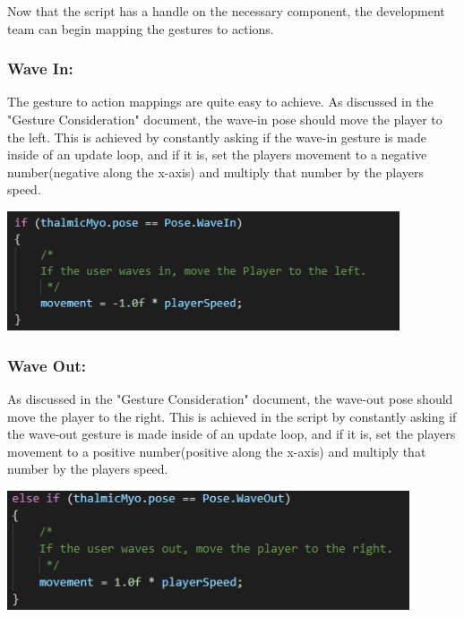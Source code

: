 \documentclass{article}
\begin{document}
\bigskip

Now that the script has a handle on the necessary component, the development team can begin mapping the gestures to actions.



\subsubsection{Wave In:}

The gesture to action mappings are quite easy to achieve. As discussed in the "Gesture Consideration" document, the wave-in pose should move the player to the left. This is achieved by constantly asking if the wave-in gesture is made inside of an update loop, and if it is, set the players movement to a negative number(negative along the x-axis) and multiply that number by the players speed.

\bigskip

\includegraphics[width=\textwidth, height=100pt]{img/MoveLeft.PNG}

\bigskip

\subsubsection{Wave Out:}
As discussed in the "Gesture Consideration" document, the wave-out pose should move the player to the right.  This is achieved in the script by constantly asking if the wave-out gesture is made inside of an update loop, and if it is, set the players movement to a positive number(positive along the x-axis) and multiply that number by the players speed. 

\bigskip

\includegraphics[width=\textwidth, height=100pt]{img/WaveOut.PNG}
\end{document}
